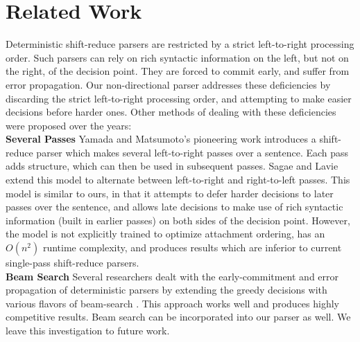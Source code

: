 \documentclass[11pt]{article}
\begin{document}
\vspace{-5pt}
\section{Related Work}
\vspace{-5pt}


Deterministic shift-reduce parsers are restricted by a strict left-to-right processing order.  Such parsers can rely on rich syntactic information on the left, but not on the right, of the decision point.  They are forced to commit early, and suffer from error propagation.  Our non-directional parser addresses these deficiencies by discarding the strict left-to-right processing order, and attempting to make easier decisions before harder ones.
Other methods of dealing with these deficiencies were proposed over the years:\\
\textbf{Several Passes}
Yamada and Matsumoto's  pioneering work introduces a shift-reduce parser which makes several left-to-right passes over a sentence.  Each pass adds %
structure, which can then be used in subsequent passes.  Sagae and Lavie  extend this model to alternate between left-to-right and right-to-left passes. %
This model is similar to ours, in that it attempts to defer harder decisions to later passes over the sentence, and allows late decisions to make use of rich syntactic information (built in earlier passes) on both sides of the decision point.  However, the model is not explicitly trained to optimize attachment ordering, has an $O(n^2)$ runtime complexity, and produces results which are inferior to current single-pass shift-reduce parsers.  \\
\textbf{Beam Search}
Several researchers dealt with the early-commitment and error propagation of deterministic parsers by extending the greedy decisions with various flavors of beam-search \cite{sagae-beam,tale-two-parsers,titov}.  This approach works well and produces highly competitive results.  Beam search can be incorporated into our parser as well.  We leave this investigation to future work.
\end{document}
